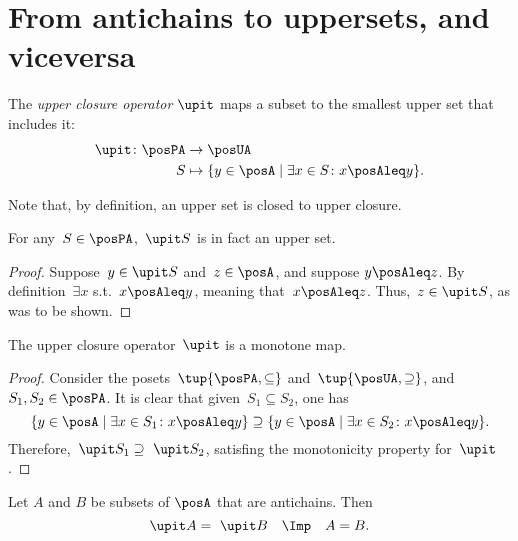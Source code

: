 
\section{From antichains to uppersets, and viceversa}
\begin{definition}
  \label{def:upperclosure}
  The \emph{upper closure operator} $\upit $ maps a subset to the smallest upper set that includes it:
  \begin{equation}
    \begin{aligned}
      \upit  \colon \posPA&\to \posUA \\
      S&\mapsto \{y\in \posA \mid \exists x\in S \colon x\posAleq y\}.
    \end{aligned}
  \end{equation}
\end{definition}
\begin{remark}
  Note that, by definition, an upper set is closed to upper closure.
\end{remark}
\begin{lemma}
  For any~$S\in \posPA$,~$\upit  S$ is in fact an upper set.
\end{lemma}
\begin{proof}
  Suppose~$y\in \upit  S$ and~$z\in \posA$, and suppose $y\posAleq z$. By definition~$\exists x$ s.t.~$x\posAleq y$, meaning that~$x\posAleq z$. Thus,~$z\in \upit  S$, as was to be shown.
\end{proof}


\begin{lemma}
  The upper closure operator~$\upit $ is a monotone map.
\end{lemma}
\begin{proof}
  Consider the posets~$\tup{\posPA,\subseteq}$ and~$\tup{\posUA ,\supseteq}$, and~$S_1,S_2\in \posPA$. It is clear that given~$S_1\subseteq S_2$, one has
  \begin{equation*}
    \{y\in \posA\mid \exists x\in S_1\colon x\posAleq y\} \supseteq \{y\in \posA\mid \exists x\in S_2\colon x\posAleq y\}.
  \end{equation*}
  Therefore,~$\upit  S_1\supseteq \ \upit  S_2$, satisfing the monotonicity property for~$\upit $.
\end{proof}

\begin{lemma}
  \label{up-cl-inj-antichains}
  Let $A$ and $B$ be subsets of $\posA$ that are antichains. Then
  \begin{equation*}
    \upit  A = \ \upit  B \quad \Imp \quad A = B.
  \end{equation*}
\end{lemma}

